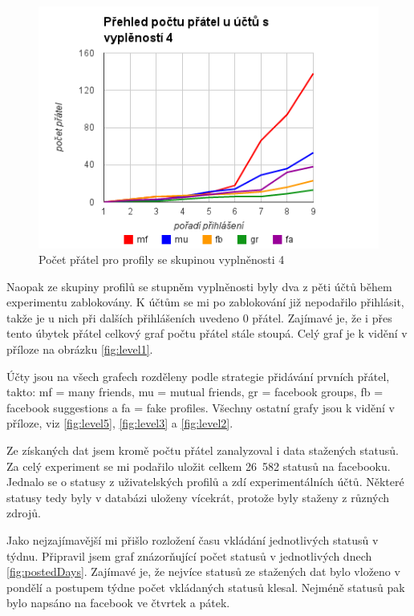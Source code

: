 \documentclass[thesis=M,czech]{FITthesis}[2013/05/10]
\begin{document}
\begin{figure}[h]
\begin{center}
\includegraphics[width=5in]{figures/level4.png}
\caption{Počet přátel pro profily se skupinou vyplněnosti 4}
\label{fig:level4}
\end{center}
\end{figure}

Naopak ze skupiny profilů se stupněm vyplněnosti byly dva z pěti účtů během experimentu zablokovány. K účtům se mi po zablokování již nepodařilo přihlásit, takže je u nich při dalších přihlášeních uvedeno 0 přátel. Zajímavé je, že i přes tento úbytek přátel celkový graf počtu přátel stále stoupá. Celý graf je k vidění v příloze na obrázku \ref{fig:level1}.

Účty jsou na všech grafech rozděleny podle strategie přidávání prvních přátel, takto: mf = many friends, mu = mutual friends, gr = facebook groups, fb = facebook suggestions a fa = fake profiles. Všechny ostatní grafy jsou k vidění v příloze, viz \ref{fig:level5}, \ref{fig:level3} a \ref{fig:level2}.


Ze získaných dat jsem kromě počtu přátel zanalyzoval i data stažených statusů. Za celý experiment se mi podařilo uložit celkem 26~582 statusů na facebooku. Jednalo se o statusy z uživatelských profilů a zdí experimentálních účtů. Některé statusy tedy byly v databázi uloženy vícekrát, protože byly staženy z různých zdrojů.

Jako nejzajímavější mi přišlo rozložení času vkládání jednotlivých statusů v týdnu. Připravil jsem graf znázorňující počet statusů v jednotlivých dnech \ref{fig:postedDays}. Zajímavé je, že nejvíce statusů ze stažených dat bylo vloženo v pondělí a postupem týdne počet vkládaných statusů klesal. Nejméně statusů pak bylo napsáno na facebook ve čtvrtek a pátek.
\end{document}

